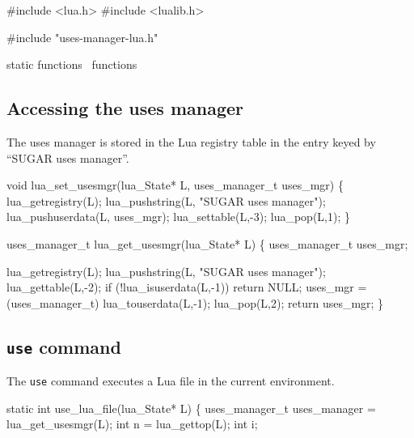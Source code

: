 #include <lua.h>
#include <lualib.h>

#include "uses-manager-lua.h"

\LA{}static functions~{\nwtagstyle{}}\RA{}
\LA{}functions~{\nwtagstyle{}}\RA{}

\nwendcode{}\nwdocspar


\subsection{Accessing the uses manager}

The uses manager is stored in the Lua registry table in the entry
keyed by ``SUGAR uses manager''.

\nwenddocs{}\endmoddef
void lua_set_usesmgr(lua_State* L, uses_manager_t uses_mgr)
\{
    lua_getregistry(L);
    lua_pushstring(L, "SUGAR uses manager");
    lua_pushuserdata(L, uses_mgr);
    lua_settable(L,-3);
    lua_pop(L,1);
\}

\nwendcode{}\nwdocspar

\nwenddocs{}\plusendmoddef
uses_manager_t lua_get_usesmgr(lua_State* L)
\{
    uses_manager_t uses_mgr;

    lua_getregistry(L);
    lua_pushstring(L, "SUGAR uses manager");
    lua_gettable(L,-2);
    if (!lua_isuserdata(L,-1))
        return NULL;
    uses_mgr = (uses_manager_t) lua_touserdata(L,-1);
    lua_pop(L,2);
    return uses_mgr;
\}

\nwendcode{}\nwdocspar


\subsection{{\tt{}use} command}

The {\tt{}use} command executes a Lua file in the current environment.

\nwenddocs{}\endmoddef
static int use_lua_file(lua_State* L)
\{
    uses_manager_t uses_manager = lua_get_usesmgr(L);
    int n = lua_gettop(L);
    int i;

